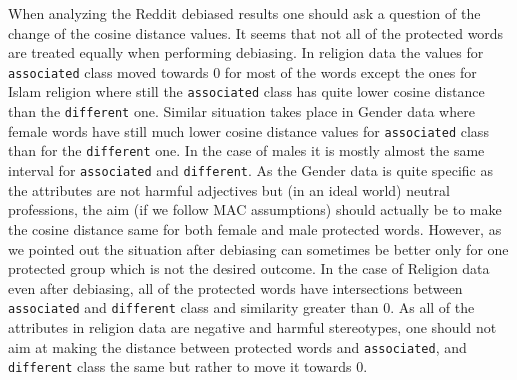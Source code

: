 \documentclass[
  12pt,
]{book}
\begin{document}
When analyzing the Reddit debiased results one should ask a question of the change of the cosine distance values. It seems that not all of the protected words are treated equally when performing debiasing. In religion data the values for \texttt{associated} class moved towards 0 for most of the words except the ones for Islam religion where still the \texttt{associated} class has quite lower cosine distance than the \texttt{different} one. Similar situation takes place in Gender data where female words have still much lower cosine distance values for \texttt{associated} class than for the \texttt{different} one. In the case of males it is mostly almost the same interval for \texttt{associated} and \texttt{different}. As the Gender data is quite specific as the attributes are not harmful adjectives but (in an ideal world) neutral professions, the aim (if we follow MAC assumptions) should actually be to make the cosine distance same for both female and male protected words. However, as we pointed out the situation after debiasing can sometimes be better only for one protected group which is not the desired outcome. In the case of Religion data even after debiasing, all of the protected words have intersections between \texttt{associated} and \texttt{different} class and similarity greater than 0. As all of the attributes in religion data are negative and harmful stereotypes, one should not aim at making the distance between protected words and \texttt{associated}, and \texttt{different} class the same but rather to move it towards 0.
\end{document}
